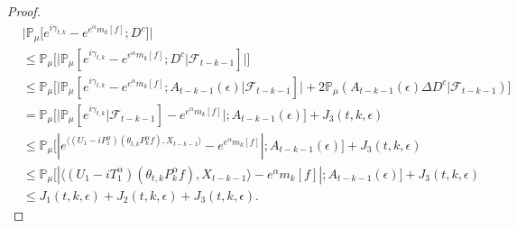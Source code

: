 \documentclass[12pt,a4paper]{amsart}
\theoremstyle{plain}
\theoremstyle{definition}
\numberwithin{equation}{section}
\begin{document}
\begin{proof}
\begin{equation}
\begin{split}
    &\big|\mathbb{P}_{\mu}\big[e^{i\gamma_{t,k}}-e^{e^{\alpha}m_k[f]}; D^c\big]\big|
    \\& \leq \mathbb{P}_{\mu}\Big[\big| \mathbb{P}_{\mu}[e^{i\gamma_{t,k}}-e^{e^{\alpha}m_k[f]}; D^c | \mathscr F_{t-k-1}]\big|\Big]
    \\& \leq \mathbb{P}_{\mu}\Big[\big| \mathbb{P}_{\mu}[e^{i\gamma_{t,k}}-e^{e^{\alpha}m_k[f]}; A_{t-k-1}(\epsilon)| \mathscr F_{t-k-1}]\big| + 2\mathbb P_\mu(A_{t-k-1}(\epsilon) \Delta D^c| \mathscr F_{t-k-1})\Big]
    \\& = \mathbb{P}_{\mu}\Big[ \big|\mathbb{P}_{\mu}[e^{i\gamma_{t,k}}| \mathscr F_{t-k-1}]-e^{e^{\alpha}m_k[f]}\big|;A_{t-k-1}(\epsilon)\Big] + J_3(t,k,\epsilon)
    \\& \leq \mathbb{P}_{\mu}\big[|e^{\langle (U_1 - iP^\alpha_1 ) (\theta_{t,k}P^\alpha_k f),X_{t-k-1}\rangle}-e^{e^{\alpha}m_k[f]}|;A_{t-k-1}(\epsilon)\big]+  J_3(t,k,\epsilon)
    \\& \leq \mathbb{P}_{\mu}\big[|\langle (U_1 - i T_1^\alpha)(\theta_{t,k}P^\alpha_k f),X_{t-k-1}\rangle-e^{\alpha}m_k[f]|;A_{t-k-1}(\epsilon)\big]+  J_3(t,k,\epsilon)
    \\&\leq J_1(t,k,\epsilon) + J_2(t,k,\epsilon)+J_3(t,k,\epsilon).
\end{split}\end{equation}


\end{proof}
\end{document}
